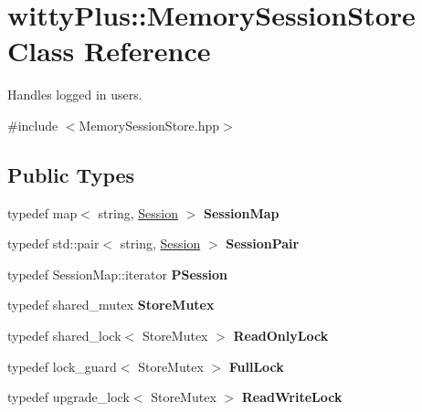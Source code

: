 \hypertarget{classwittyPlus_1_1MemorySessionStore}{
\section{wittyPlus::MemorySessionStore Class Reference}
\label{classwittyPlus_1_1MemorySessionStore}
}


Handles logged in users.  




{\ttfamily \#include $<$MemorySessionStore.hpp$>$}

\subsection*{Public Types}
\begin{DoxyCompactItemize}
\item 
\hypertarget{classwittyPlus_1_1MemorySessionStore_a1bd55c95da4992108bab31b376969d33}{
typedef map$<$ string, \hyperlink{classwittyPlus_1_1Session}{Session} $>$ {\bfseries SessionMap}}
\label{classwittyPlus_1_1MemorySessionStore_a1bd55c95da4992108bab31b376969d33}

\item 
\hypertarget{classwittyPlus_1_1MemorySessionStore_afd1fc3f2da74abcccc9fdf47982cb16b}{
typedef std::pair$<$ string, \hyperlink{classwittyPlus_1_1Session}{Session} $>$ {\bfseries SessionPair}}
\label{classwittyPlus_1_1MemorySessionStore_afd1fc3f2da74abcccc9fdf47982cb16b}

\item 
\hypertarget{classwittyPlus_1_1MemorySessionStore_acafdc27ad99d681c9285fe5d6b5e01a5}{
typedef SessionMap::iterator {\bfseries PSession}}
\label{classwittyPlus_1_1MemorySessionStore_acafdc27ad99d681c9285fe5d6b5e01a5}

\item 
\hypertarget{classwittyPlus_1_1MemorySessionStore_aeb970d29986fa7c3715383fa05b91630}{
typedef shared\_\-mutex {\bfseries StoreMutex}}
\label{classwittyPlus_1_1MemorySessionStore_aeb970d29986fa7c3715383fa05b91630}

\item 
\hypertarget{classwittyPlus_1_1MemorySessionStore_a5d3bad88d243a293a6afeb06461f79c4}{
typedef shared\_\-lock$<$ StoreMutex $>$ {\bfseries ReadOnlyLock}}
\label{classwittyPlus_1_1MemorySessionStore_a5d3bad88d243a293a6afeb06461f79c4}

\item 
\hypertarget{classwittyPlus_1_1MemorySessionStore_a18e385d0d6b6d0ba9c081683078885c4}{
typedef lock\_\-guard$<$ StoreMutex $>$ {\bfseries FullLock}}
\label{classwittyPlus_1_1MemorySessionStore_a18e385d0d6b6d0ba9c081683078885c4}

\item 
\hypertarget{classwittyPlus_1_1MemorySessionStore_a1449c32e3baa3600755341d6a4385085}{
typedef upgrade\_\-lock$<$ StoreMutex $>$ {\bfseries ReadWriteLock}}
\label{classwittyPlus_1_1MemorySessionStore_a1449c32e3baa3600755341d6a4385085}

\end{DoxyCompactItemize}
